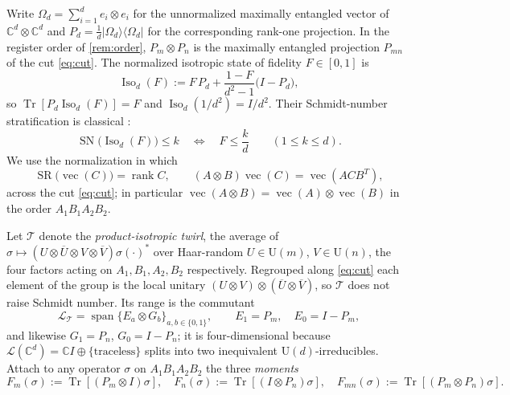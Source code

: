 \documentclass[11pt,reqno]{amsart}
\theoremstyle{plain}
\theoremstyle{remark}
\DeclareMathOperator{\Tr}{Tr}
\DeclareMathOperator{\rank}{rank}
\DeclareMathOperator{\SN}{SN}
\DeclareMathOperator{\SR}{SR}
\DeclareMathOperator{\vecop}{vec}
\DeclareMathOperator{\Iso}{Iso}
\newcommand{\cL}{\mathcal L}
\newcommand{\cT}{\mathcal T}
\newcommand{\ketbra}[2]{\lvert #1\rangle\!\langle #2\rvert}
\newcommand{\C}{\mathbb C}
\begin{document}
Write $\Omega_d=\sum_{i=1}^de_i\otimes e_i$ for the unnormalized maximally
entangled vector of $\C^d\otimes\C^d$ and
$P_d=\frac1d\ketbra{\Omega_d}{\Omega_d}$ for the corresponding rank-one
projection.  In the register order of \cref{rem:order},
$P_m\otimes P_n$ is the maximally entangled projection $P_{mn}$ of the cut
\cref{eq:cut}.  The normalized isotropic state of fidelity $F\in[0,1]$ is
\begin{equation}
\label{eq:iso}
    \Iso_d(F):=F\,P_d+\frac{1-F}{d^2-1}\bigl(I-P_d\bigr),
\end{equation}
so $\Tr[P_d\Iso_d(F)]=F$ and $\Iso_d(1/d^2)=I/d^2$.  Their Schmidt-number
stratification is classical \cite{TerhalHorodecki2000}:
\begin{equation}
\label{eq:TH}
    \SN\bigl(\Iso_d(F)\bigr)\le k
    \quad\Longleftrightarrow\quad
    F\le\frac kd
    \qquad(1\le k\le d).
\end{equation}
We use the normalization in which
\begin{equation}
\label{eq:SR-rank}
    \SR\bigl(\vecop(C)\bigr)=\rank C ,
    \qquad
    (A\otimes B)\vecop(C)=\vecop(ACB^T),
\end{equation}
across the cut \cref{eq:cut}; in particular
$\vecop(A\otimes B)=\vecop(A)\otimes\vecop(B)$ in the order $A_1B_1A_2B_2$.

Let $\cT$ denote the \emph{product-isotropic twirl}, the average of
$\sigma\mapsto(U\otimes\overline U\otimes V\otimes\overline V)\sigma(\cdot)^*$
over Haar-random $U\in\mathrm U(m)$, $V\in\mathrm U(n)$, the four factors acting
on $A_1,B_1,A_2,B_2$ respectively.  Regrouped along \cref{eq:cut} each element
of the group is the local unitary
$(U\otimes V)\otimes(\overline U\otimes\overline V)$, so $\cT$ does not raise
Schmidt number.  Its range is the commutant
\begin{equation}
\label{eq:commutant}
    \cL_{\cT}
    =\operatorname{span}\bigl\{E_a\otimes G_b\bigr\}_{a,b\in\{0,1\}},
    \qquad
    E_1=P_m,\quad E_0=I-P_m,
\end{equation}
and likewise $G_1=P_n$, $G_0=I-P_n$; it is four-dimensional because
$\cL(\C^d)=\C I\oplus\{\text{traceless}\}$ splits into two inequivalent
$\mathrm U(d)$-irreducibles.  Attach to any operator $\sigma$ on
$A_1B_1A_2B_2$ the three \emph{moments}
\begin{equation}
\label{eq:moments}
    F_m(\sigma):=\Tr[(P_m\otimes I)\sigma],
    \quad
    F_n(\sigma):=\Tr[(I\otimes P_n)\sigma],
    \quad
    F_{mn}(\sigma):=\Tr[(P_m\otimes P_n)\sigma].
\end{equation}
\end{document}
